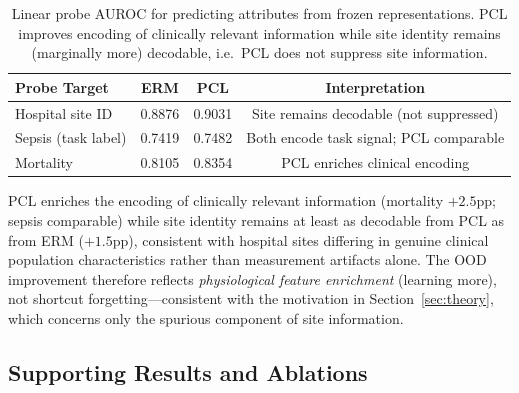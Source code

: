 \documentclass{article}
\begin{document}
\begin{table}[htbp]
\caption{Linear probe AUROC for predicting attributes from frozen representations. PCL improves encoding of clinically relevant information while site identity remains (marginally more) decodable, i.e.\ PCL does not suppress site information.}
\label{tab:probes}
\centering
\small
\begin{tabular}{@{}lccc@{}}
\toprule
Probe Target & ERM & PCL & Interpretation \\
\midrule
Hospital site ID & 0.8876 & 0.9031 & Site remains decodable (not suppressed) \\
Sepsis (task label) & 0.7419 & 0.7482 & Both encode task signal; PCL comparable \\
Mortality & 0.8105 & 0.8354 & PCL enriches clinical encoding \\
\bottomrule
\end{tabular}
\end{table}

PCL enriches the encoding of clinically relevant information (mortality $+2.5$pp; sepsis comparable) while site identity remains at least as decodable from PCL as from ERM ($+1.5$pp), consistent with hospital sites differing in genuine clinical population characteristics rather than measurement artifacts alone. The OOD improvement therefore reflects \emph{physiological feature enrichment} (learning more), not shortcut forgetting---consistent with the motivation in Section~\ref{sec:theory}, which concerns only the spurious component of site information.

\subsection{Supporting Results and Ablations}
\label{sec:supporting}
\end{document}
